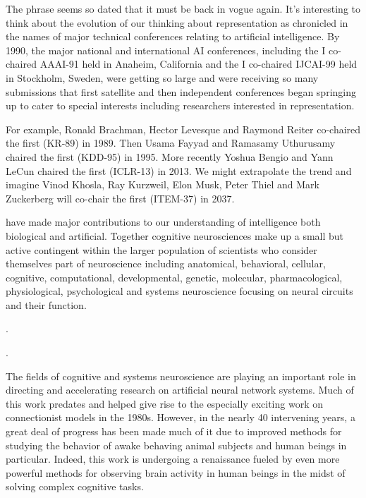 {{{  The phrase {} seems so dated that it must be back in vogue again. It's interesting to think about the evolution of our thinking about representation as chronicled in the names of major technical conferences relating to artificial intelligence. By 1990, the major national and international AI conferences, including the {} \emdash{} I co-chaired AAAI-91 held in Anaheim, California \emdash{} and the {} \emdash{} I co-chaired IJCAI-99 held in Stockholm, Sweden, were getting so large and were receiving so many submissions that first satellite and then independent conferences began springing up to cater to special interests including researchers interested in representation.

  For example, Ronald Brachman, Hector Levesque and Raymond Reiter co-chaired the first {} (KR-89) in 1989. Then Usama Fayyad and Ramasamy Uthurusamy chaired the first {} (KDD-95) in 1995. More recently Yoshua Bengio and Yann LeCun chaired the first {} (ICLR-13) in 2013. We might extrapolate the trend and imagine Vinod Khosla, Ray Kurzweil, Elon Musk, Peter Thiel and Mark Zuckerberg will co-chair the first {} (ITEM-37) in 2037.}
%
\emdash{} have made major contributions to our understanding of intelligence both biological and artificial. Together cognitive neurosciences make up a small but active contingent within the larger population of scientists who consider themselves part of neuroscience including anatomical, behavioral, cellular, cognitive, computational, developmental, genetic, molecular, pharmacological, physiological, psychological and systems neuroscience focusing on neural circuits and their function.}.}.

The fields of cognitive and systems neuroscience are playing an important role in directing and accelerating research on artificial neural network systems. Much of this work predates and helped give rise to the especially exciting work on connectionist models in the 1980s. However, in the nearly 40 intervening years, a great deal of progress has been made much of it due to improved methods for studying the behavior of awake behaving animal subjects and human beings in particular. Indeed, this work is undergoing a renaissance fueled by even more powerful methods for observing brain activity in human beings in the midst of solving complex cognitive tasks.

